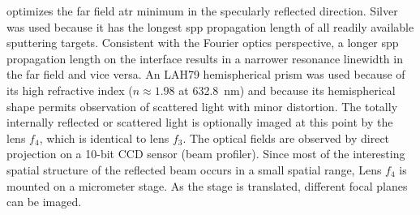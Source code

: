 optimizes the far field \gls{atr} minimum in the specularly reflected
direction.  Silver was used because it has the longest \gls{spp} propagation
length of all readily available sputtering targets.
Consistent with the Fourier optics perspective, a longer \gls{spp} propagation
length on the interface results in a narrower resonance linewidth in the
far field and vice versa.  An LAH79 hemispherical prism was used because of
its high refractive index ($n\approx 1.98$ at \SI{632.8}{\nano\meter}) and
because its hemispherical shape permits observation of scattered light with
minor distortion.  The totally internally reflected or scattered light is
optionally imaged at this point by the lens $f_4$, which is identical to
lens $f_3$.  The optical fields are observed by direct projection on a 10-bit
CCD sensor (beam profiler).  Since most of the interesting spatial structure of the
reflected beam occurs in a small spatial range, Lens $f_4$
is mounted on a micrometer stage.  As the stage is translated, different focal
planes can be imaged.

